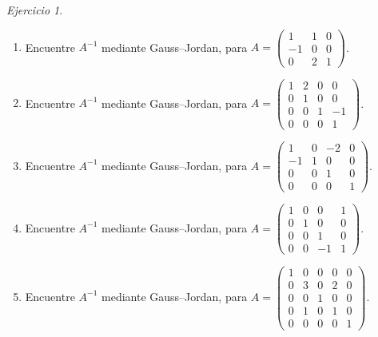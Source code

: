 \documentclass[12pt]{article}
\theoremstyle{remark}
\newtheorem{Ejer}[definicion]{Ejercicio}
\begin{document}
\begin{Ejer}
\begin{enumerate}[resume=banco]
\item Encuentre $A^{-1}$ mediante Gauss--Jordan, para $A=\begin{pmatrix}1&1&0\\-1&0&0\\0&2&1\end{pmatrix}$.

\item Encuentre $A^{-1}$ mediante Gauss--Jordan, para $A=\begin{pmatrix}1&2&0&0\\0&1&0&0\\0&0&1&-1\\0&0&0&1\end{pmatrix}$.

\item Encuentre $A^{-1}$ mediante Gauss--Jordan, para $A=\begin{pmatrix}1&0&-2&0\\-1&1&0&0\\0&0&1&0\\0&0&0&1\end{pmatrix}$.

\item Encuentre $A^{-1}$ mediante Gauss--Jordan, para $A=\begin{pmatrix}1&0&0&1\\0&1&0&0\\0&0&1&0\\0&0&-1&1\end{pmatrix}$.

\item Encuentre $A^{-1}$ mediante Gauss--Jordan, para $A=\begin{pmatrix}1&0&0&0&0\\0&3&0&2&0\\0&0&1&0&0\\0&1&0&1&0\\0&0&0&0&1\end{pmatrix}$.

\end{enumerate}
\end{Ejer}
\end{document}
